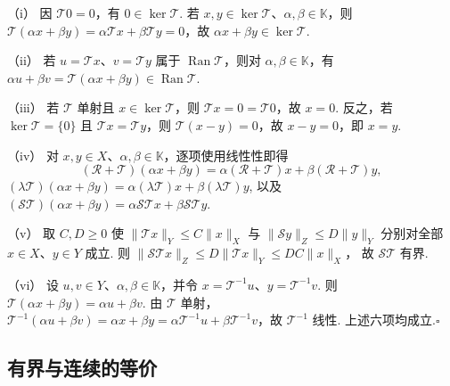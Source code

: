 \begin{FAProof}
（i） 因 \(\displaystyle \mathcal T0=0\)，有 \(\displaystyle 0\in\ker\mathcal T\). 若 \(\displaystyle x,y\in\ker\mathcal T\)、\(\displaystyle \alpha,\beta\in\mathbb K\)，则 \(\displaystyle \mathcal T(\alpha x+\beta y)=\alpha\mathcal T x+\beta\mathcal T y=0\)，故 \(\displaystyle \alpha x+\beta y\in\ker\mathcal T\).

（ii） 若 \(\displaystyle u=\mathcal T x\)、\(\displaystyle v=\mathcal T y\) 属于 \(\displaystyle \operatorname{Ran}\mathcal T\)，则对 \(\displaystyle \alpha,\beta\in\mathbb K\)，有 \(\displaystyle \alpha u+\beta v=\mathcal T(\alpha x+\beta y)\in\operatorname{Ran}\mathcal T\).

（iii） 若 \(\displaystyle \mathcal T\) 单射且 \(\displaystyle x\in\ker\mathcal T\)，则 \(\displaystyle \mathcal T x=0=\mathcal T0\)，故 \(\displaystyle x=0\). 反之，若 \(\displaystyle \ker\mathcal T=\{0\}\) 且 \(\displaystyle \mathcal T x=\mathcal T y\)，则 \(\displaystyle \mathcal T(x-y)=0\)，故 \(\displaystyle x-y=0\)，即 \(\displaystyle x=y\).

（iv） 对 \(\displaystyle x,y\in X\)、\(\displaystyle \alpha,\beta\in\mathbb K\)，逐项使用线性性即得
\[
(\mathcal R+\mathcal T)(\alpha x+\beta y)
=\alpha(\mathcal R+\mathcal T)x+\beta(\mathcal R+\mathcal T)y,
\] \(\displaystyle (\lambda\mathcal T)(\alpha x+\beta y) =\alpha(\lambda\mathcal T)x+\beta(\lambda\mathcal T)y\),
以及 \(\displaystyle (\mathcal S\mathcal T)(\alpha x+\beta y)=\alpha\mathcal S\mathcal T x+\beta\mathcal S\mathcal T y\).

（v） 取 \(\displaystyle C,D\geqslant0\) 使 \(\displaystyle \|\mathcal T x\|_Y\leqslant C\|x\|_X\) 与 \(\displaystyle \|\mathcal S y\|_Z\leqslant D\|y\|_Y\) 分别对全部 \(\displaystyle x\in X\)、\(\displaystyle y\in Y\) 成立. 则 \(\displaystyle \|\mathcal S\mathcal T x\|_Z \leqslant D\|\mathcal T x\|_Y \leqslant DC\|x\|_X\)，
故 \(\displaystyle \mathcal S\mathcal T\) 有界.

（vi） 设 \(\displaystyle u,v\in Y\)、\(\displaystyle \alpha,\beta\in\mathbb K\)，并令 \(\displaystyle x=\mathcal T^{-1}u\)、\(\displaystyle y=\mathcal T^{-1}v\). 则 \(\displaystyle \mathcal T(\alpha x+\beta y)=\alpha u+\beta v\).
由 \(\displaystyle \mathcal T\) 单射，\(\displaystyle \mathcal T^{-1}(\alpha u+\beta v)=\alpha x+\beta y=\alpha\mathcal T^{-1}u+\beta\mathcal T^{-1}v\)，故 \(\displaystyle \mathcal T^{-1}\) 线性. 上述六项均成立.\hfill\(\square\)
\end{FAProof}

\subsection{有界与连续的等价}

